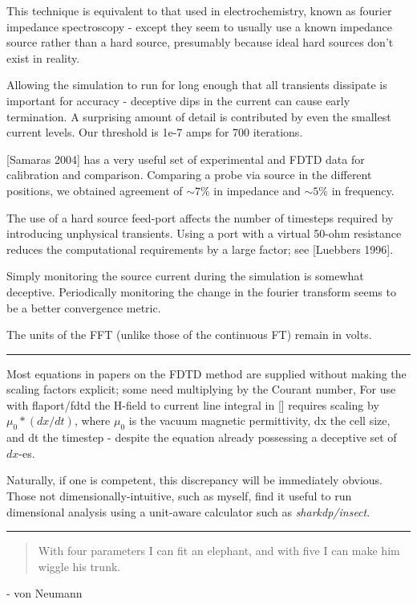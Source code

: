 \documentclass[paper.tex]{subfiles}
\begin{document}
This technique is equivalent to that used in electrochemistry, known as fourier impedance spectroscopy - except they seem to usually use a known impedance source rather than a hard source, presumably because ideal hard sources don't exist in reality.

Allowing the simulation to run for long enough that all transients dissipate is important for accuracy - deceptive dips in the current can cause early termination. A surprising amount of detail is contributed by even the smallest current levels. Our threshold is 1e-7 amps for 700 iterations.

[Samaras 2004] has a very useful set of experimental and FDTD data for calibration and comparison. Comparing a probe via source in the different positions, we obtained agreement of $\sim 7\%$ in impedance and $\sim 5\%$ in frequency.

The use of a hard source feed-port affects the number of timesteps required by introducing unphysical transients. Using a port with a virtual 50-ohm resistance reduces the computational requirements by a large factor; see [Luebbers 1996].

Simply monitoring the source current during the simulation is somewhat deceptive. Periodically monitoring the change in the fourier transform seems to be a better convergence metric.

The units of the FFT (unlike those of the continuous FT) remain in volts.

\rule{\linewidth}{0.2pt}

Most equations in papers on the FDTD method are supplied without making the scaling factors explicit; some need multiplying by the Courant number, For use with flaport/fdtd the H-field to current line integral in [] requires scaling by $\mu_0 * (dx/dt)$, where $\mu_0$ is the vacuum magnetic permittivity, dx the cell size, and dt the timestep - despite the equation already possessing a deceptive set of $dx$-es.

Naturally, if one is competent, this discrepancy will be immediately obvious. Those not dimensionally-intuitive, such as myself, find it useful to run dimensional analysis using a unit-aware calculator such as {\it sharkdp/insect}.

\rule{\linewidth}{0.2pt}



\begin{quote}
With four parameters I can fit an elephant, and with five I can make him wiggle his trunk.
\end{quote}
- von Neumann  
\end{document}
